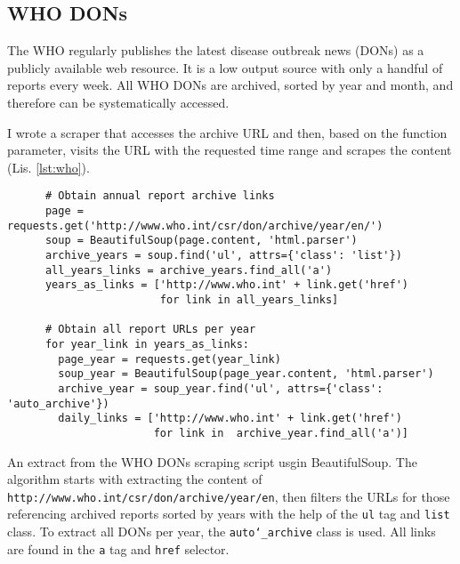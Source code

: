 \subsection{WHO DONs}
  The WHO regularly publishes the latest disease outbreak news (DONs) as a publicly available web resource.
  It is a low output source with only a handful of reports every week.
  All WHO DONs are archived, sorted by year and month, and therefore can be systematically accessed.

  I wrote a scraper that accesses the archive URL and then, based on the function parameter, visits the URL with the requested time range and scrapes the content (Lis. \ref{lst:who}).

  \begin{listing}[h]
    \begin{verbatim}
      # Obtain annual report archive links
      page = requests.get('http://www.who.int/csr/don/archive/year/en/')
      soup = BeautifulSoup(page.content, 'html.parser')
      archive_years = soup.find('ul', attrs={'class': 'list'})
      all_years_links = archive_years.find_all('a')
      years_as_links = ['http://www.who.int' + link.get('href')
                        for link in all_years_links]

      # Obtain all report URLs per year
      for year_link in years_as_links:
        page_year = requests.get(year_link)
        soup_year = BeautifulSoup(page_year.content, 'html.parser')
        archive_year = soup_year.find('ul', attrs={'class': 'auto_archive'})
        daily_links = ['http://www.who.int' + link.get('href')
                       for link in  archive_year.find_all('a')]
    \end{verbatim}
    \caption{An extract from the WHO DONs scraping script usgin BeautifulSoup. The algorithm starts with extracting the content of \textquotesingle \texttt{http://www.who.int/csr/don/archive/year/en}\textquotesingle, then filters the URLs for those referencing archived reports sorted by years with the help of the \texttt{ul} tag and \texttt{list} class. To extract all DONs per year, the \texttt{auto\char`_archive} class is used. All links are found in the \texttt{a} tag and \texttt{href} selector.}
    \label{lst:who}
  \end{listing}

